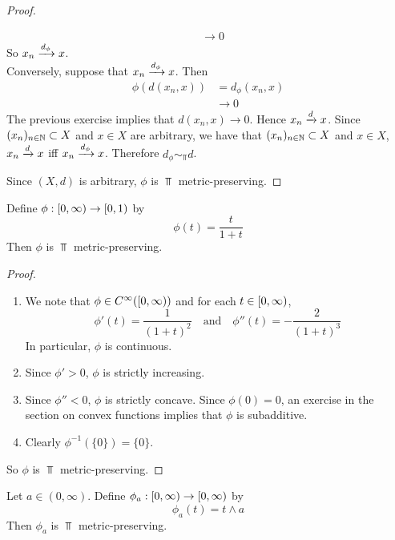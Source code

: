 \documentclass{book}
\begin{document}
\begin{proof}
\begin{enumerate}
\begin{align*}
			& \rightarrow 0 
		\end{align*}
		So $x_n \xrightarrow{d_{\phi}} x$. \\
		Conversely, suppose that $x_n \xrightarrow{d_{\phi}} x$. Then 
		\begin{align*}
			\phi(d(x_n,x))
			& = d_{\phi}(x_n, x) \\
			& \rightarrow 0
		\end{align*}
		The previous exercise implies that $d(x_n,x) \rightarrow 0$. Hence $x_n \xrightarrow{d} x$. Since $(x_n)_{n \in \mathbb{N}} \subset X$ and $x \in X$ are arbitrary, we have that $(x_n)_{n \in \mathbb{N}} \subset X$ and $x \in X$, $x_n \xrightarrow{d} x$ iff $x_n \xrightarrow{d_{\phi}} x$. Therefore $d_{\phi} \sim_{\Top} d$. 
	\end{enumerate}
	Since $(X, d)$ is arbitrary, $\phi$ is $\Top$ metric-preserving.
\end{proof}

\begin{ex}
	Define $\phi:[0,\infty) \rightarrow [0,1)$ by 
	$$\phi(t) = \frac{t}{1+t}$$
	Then $\phi$ is $\Top$ metric-preserving.
\end{ex}

\begin{proof}\
\begin{enumerate}
	\item We note that $\phi \in C^{\infty}([0,\infty))$ and for each $t \in [0,\infty)$, 
	$$\phi'(t) = \frac{1}{(1+t)^2} \quad \text{and} \quad \phi''(t) = -\frac{2}{(1+t)^3}$$
	In particular, $\phi$ is continuous.
	\item Since $\phi' > 0$, $\phi$ is strictly increasing. 
	\item Since $\phi'' < 0$, $\phi$ is strictly concave. Since $\phi(0) = 0$, an exercise in the section on convex functions implies that $\phi$ is subadditive. 
	\item Clearly $\phi^{-1}(\{0\}) = \{0\}$.
\end{enumerate}	
	So $\phi$ is $\Top$ metric-preserving.
\end{proof}

\begin{ex}
	Let $a \in (0, \infty)$. Define $\phi_a:[0,\infty) \rightarrow [0,\infty)$ by 
	$$\phi_a(t) = t \wedge a$$
	Then $\phi_a$ is $\Top$ metric-preserving.
\end{ex}
\end{document}

